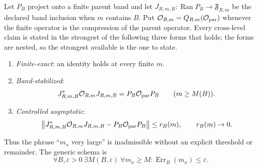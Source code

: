 \documentclass[12pt,a4paper]{article}
\begin{document}
\begin{definition}
\label{p2:def:typed-continuum-contract}
Let \(P_B\) project onto a finite parent band and let
\(J_{R,m,B}:\operatorname{Ran}P_B\to\mathfrak F_{R,m}\) be the declared
band inclusion when \(m\) contains \(B\).  Put
\(\mathcal O_{R,m}=Q_{R,m}(\mathcal O_{\rm par})\) whenever the finite
operator is the compression of the parent operator.  Every cross-level claim
is stated in the strongest of the following three forms that holds; the forms
are nested, so the strongest available is the one to state.
\begin{enumerate}[label=(\roman*),leftmargin=2em]
\item \emph{Finite-exact}: an identity holds at every finite \(m\).
\item \emph{Band-stabilized}:
\[
 J_{R,m,B}^*\mathcal O_{R,m}J_{R,m,B}
 =P_B\mathcal O_{\rm par}P_B
 \qquad(m\ge M(B)).
\]
\item \emph{Controlled asymptotic}:
\[
 \bigl\|J_{R,m,B}^*\mathcal O_{R,m}J_{R,m,B}
       -P_B\mathcal O_{\rm par}P_B\bigr\|
 \le r_B(m),
 \qquad r_B(m)\to0.
\]
\end{enumerate}
Thus the phrase ``\(m_x\) very large'' is inadmissible without an explicit
threshold or remainder.  The generic schema is
\[
 \forall B,\varepsilon>0\ \exists M(B,\varepsilon)\ \forall m_x\ge M:
 \operatorname{Err}_B(m_x)\le\varepsilon.
\]
\end{definition}
\end{document}
